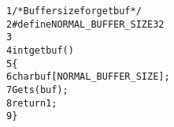 \begin{alltt}
{\scriptsize   1} /* Buffer size for getbuf */
{\scriptsize   2} #define NORMAL_BUFFER_SIZE 32
{\scriptsize   3} 
{\scriptsize   4} int getbuf()
{\scriptsize   5} \verb:{:
{\scriptsize   6}     char buf[NORMAL_BUFFER_SIZE];
{\scriptsize   7}     Gets(buf);
{\scriptsize   8}     return 1;
{\scriptsize   9} \verb:}:
\end{alltt}
